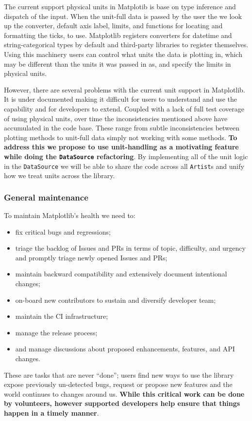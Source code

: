 \documentclass[12pt]{article}
\numberwithin{page}{section}
\begin{document}

The current support physical units in Matplotib is base on type
inference and dispatch of the input.  When the unit-full data is
passed by the user the we look up the converter, default axis label,
limits, and functions for locating and formatting the ticks, to use.
Matplotlib registers converters for datetime and string-categorical
types by default and third-party libraries to register themselves.
Using this machinery users can control what units the data is plotting
in, which may be different than the units it was passed in as, and
specify the limits in physical units.


However, there are several problems with the current unit support in
Matplotlib.  It is under documented making it difficult for users to
understand and use the capability and for developers to extend.
Coupled with a lack of full test coverage of using physical units,
over time the inconsistencies mentioned above have accumulated in the
code base.  These range from subtle inconsistencies between plotting
methods to unit-full data simply not working with some methods.
\textbf{To address this we propose to use unit-handling as a
  motivating feature while doing the \texttt{DataSource} refactoring}.
By implementing all of the unit logic in the \texttt{DataSource} we
will be able to share the code across all \texttt{Artist}s and unify
how we treat units across the library.


\subsubsection{General maintenance}

To maintain Matplotlib's health we need to:
\begin{itemize}[noitemsep]
\item fix critical bugs and regressions;
\item triage the backlog of Issues and PRs in terms of topic,
  difficulty, and urgency and promptly triage newly opened Issues and
  PRs;
\item maintain backward compatibility and extensively document
  intentional changes;
\item on-board new contributors to sustain and diversify developer
  team;
\item maintain the CI infrastructure;
\item manage the release process;
\item and manage discussions about proposed enhancements, features,
  and API changes.
\end{itemize}
These are tasks that are never ``done''; users find new ways to use
the library expose previously un-detected bugs, request or propose new
features and the world continues to changes around us.  \textbf{While
  this critical work can be done by volunteers, however supported
  developers help ensure that things happen in a timely manner}.
\end{document}
